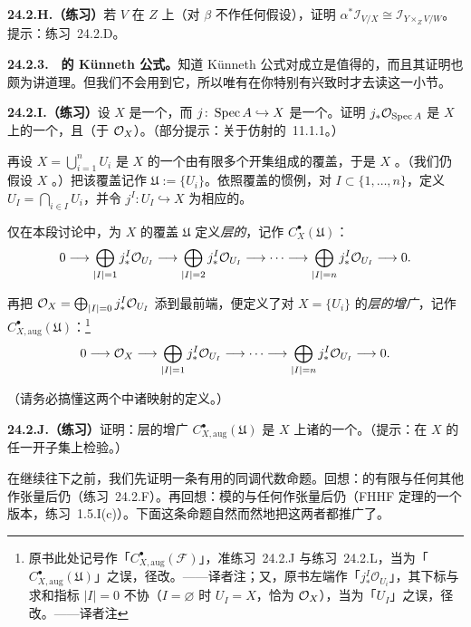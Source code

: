 \textbf{24.2.H.（练习）}\quad 若 $V$ 在 $Z$ 上\trFlat（对 $\beta$ 不作任何假设），证明 $\alpha^*\mathscr{I}_{V/X}\cong\mathscr{I}_{Y\times_Z V/W}$。提示：\mbox{练习~24.2.D}。

\textbf{24.2.3.}\ \hard\ \textbf{\trQCSheaf{}的 K\"unneth 公式。}\quad 知道 K\"unneth 公式对\trQCSheaf{}成立是值得的，而且其证明也颇为讲道理。但我们不会用到它，所以唯有在你特别有兴致时才去读这一小节。

\textbf{24.2.I.（练习）}\quad 设 $X$ 是一个\trSeparated\trScheme，而 $j\colon\operatorname{Spec} A\hookrightarrow X$ 是一个\trOpenEmbedding。证明 $j_*\mathcal{O}_{\operatorname{Spec} A}$ 是 $X$ 上的一个\trQCSheaf，且\trFlat（于 $\mathcal{O}_X$）。（部分提示：关于仿射\trMorphism{}的\mbox{\trCancellationTheorem{}~11.1.1}。）

再设 $X=\bigcup_{i=1}^{n}U_i$ 是 $X$ 的一个由有限多个\trAffine{}开集组成的覆盖，于是 $X$ \trQuasicompact。（我们仍假设 $X$ \trSeparated。）把该覆盖记作 $\mathfrak{U}:=\{U_i\}$。依照\trCech{}覆盖的惯例，对 $I\subset\{1,\dots,n\}$，定义 $U_I=\bigcap_{i\in I}U_i$，并令 $j^I\colon U_I\hookrightarrow X$ 为相应的\trOpenEmbedding。

仅在本段讨论中，为 $X$ 的覆盖 $\mathfrak{U}$ 定义\emph{层的\trCech\trComplexN}，记作 $C^{\bullet}_X(\mathfrak{U})$：
\[
0 \longrightarrow \bigoplus_{|I|=1} j^I_*\mathcal{O}_{U_I} \longrightarrow \bigoplus_{|I|=2} j^I_*\mathcal{O}_{U_I} \longrightarrow \cdots \longrightarrow \bigoplus_{|I|=n} j^I_*\mathcal{O}_{U_I} \longrightarrow 0.
\]

再把 $\mathcal{O}_X=\bigoplus_{|I|=0}j^I_*\mathcal{O}_{U_I}$ 添到最前端，便定义了对 $X=\{U_i\}$ 的\emph{层的增广\trCech\trComplexN}，记作 $C^{\bullet}_{X,\mathrm{aug}}(\mathfrak{U})$：\footnote{原书此处记号作「$C^{\bullet}_{X,\mathrm{aug}}(\mathscr{F})$」，准\mbox{练习~24.2.J} 与\mbox{练习~24.2.L}，当为「$C^{\bullet}_{X,\mathrm{aug}}(\mathfrak{U})$」之误，径改。——译者注；又，原书左端作「$j^I_*\mathscr{O}_{U_i}$」，其下标与求和指标 $|I|=0$ 不协（$I=\varnothing$ 时 $U_I=X$，恰为 $\mathcal{O}_X$），当为「$U_I$」之误，径改。——译者注}
\[
0 \longrightarrow \mathcal{O}_X \longrightarrow \bigoplus_{|I|=1} j^I_*\mathcal{O}_{U_I} \longrightarrow \cdots \longrightarrow \bigoplus_{|I|=n} j^I_*\mathcal{O}_{U_I} \longrightarrow 0.
\]

（请务必搞懂这两个\trComplexN{}中诸映射的定义。）

\textbf{24.2.J.（练习）}\quad 证明：层的增广\trCech\trComplexN{} $C^{\bullet}_{X,\mathrm{aug}}(\mathfrak{U})$ 是 $X$ 上诸\trFlat\trQCSheaf{}的一个\trExactSequence。（提示：在 $X$ 的任一\trAffine{}开子集上检验。）

在继续往下之前，我们先证明一条有用的同调代数命题。回想：\trFlat\trModule{}的有限\trExactSequence{}与任何其他\trModule{}作张量后仍\trExact（\mbox{练习~24.2.F}）。再回想：模的\trExactSequence{}与任何\trFlat\trModule{}作张量后仍\trExact（FHHF 定理的一个版本，\mbox{练习~1.5.I}(c)）。下面这条命题自然而然地把这两者都推广了。

